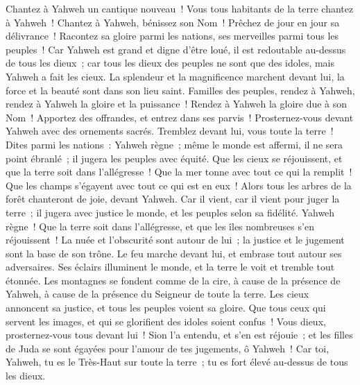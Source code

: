 \begin{multicols}{2}
\VerseOne{}Chantez à Yahweh un cantique nouveau~! Vous tous habitants de la terre chantez à Yahweh~!
Chantez à Yahweh, bénissez son Nom~! Prêchez de jour en jour sa délivrance~!
Racontez sa gloire parmi les nations, ses merveilles parmi tous les peuples~!
Car Yahweh est grand et digne d'être loué, il est redoutable au-dessus de tous les dieux~;
car tous les dieux des peuples ne sont que des idoles, mais Yahweh a fait les cieux.
La splendeur et la magnificence marchent devant lui, la force et la beauté sont dans son lieu saint.
Familles des peuples, rendez à Yahweh, rendez à Yahweh la gloire et la puissance~!
Rendez à Yahweh la gloire due à son Nom~! Apportez des offrandes, et entrez dans ses parvis~!
Prosternez-vous devant Yahweh avec des ornements sacrés. Tremblez devant lui, vous toute la terre~!
Dites parmi les nations~: Yahweh règne~; même le monde est affermi, il ne sera point ébranlé~; il jugera les peuples avec équité.
Que les cieux se réjouissent, et que la terre soit dans l'allégresse~! Que la mer tonne avec tout ce qui la remplit~!
Que les champs s'égayent avec tout ce qui est en eux~! Alors tous les arbres de la forêt chanteront de joie,
devant Yahweh. Car il vient, car il vient pour juger la terre~; il jugera avec justice le monde, et les peuples selon sa fidélité.
\VerseOne{}Yahweh règne~! Que la terre soit dans l'allégresse, et que les îles nombreuses s'en réjouissent~!
La nuée et l'obscurité sont autour de lui~; la justice et le jugement sont la base de son trône.
Le feu marche devant lui, et embrase tout autour ses adversaires.
Ses éclairs illuminent le monde, et la terre le voit et tremble tout étonnée.
Les montagnes se fondent comme de la cire, à cause de la présence de Yahweh, à cause de la présence du Seigneur de toute la terre.
Les cieux annoncent sa justice, et tous les peuples voient sa gloire.
Que tous ceux qui servent les images, et qui se glorifient des idoles soient confus~! Vous dieux, prosternez-vous tous devant lui~!
Sion l'a entendu, et s'en est réjouie~; et les filles de Juda se sont égayées pour l'amour de tes jugements, ô Yahweh~!
Car toi, Yahweh, tu es le Très-Haut sur toute la terre~; tu es fort élevé au-dessus de tous les dieux.

\end{multicols}
